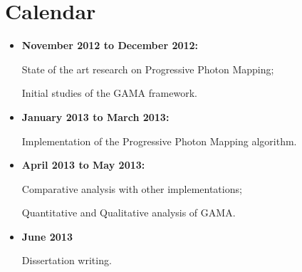\section{Calendar}

\begin{itemize}
  \item \textbf{November 2012 to December 2012:}

    \sudoindent State of the art research on Progressive Photon Mapping;

    \sudoindent Initial studies of the GAMA framework.


  \item \textbf{January 2013 to March 2013:}

    \sudoindent Implementation of the Progressive Photon Mapping algorithm.


  \item \textbf{April 2013 to May 2013:}

    \sudoindent  Comparative analysis with other implementations;

    \sudoindent Quantitative and Qualitative analysis of GAMA.


  \item \textbf{June 2013}

      \sudoindent Dissertation writing.
\end{itemize}
